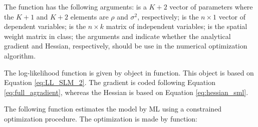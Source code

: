 \begin{knitrout}
\begin{kframe}
\begin{alltt}
    \hlstd{H[K} \hlopt{+}  \hlopt{+} \hlstd{]} \hlkwb{<-} 
    \hlstd{H[K} \hlopt{+}  \hlopt{+} \hlstd{]} \hlkwb{<-} 
    \hlstd{H[K} \hlopt{+} \hlstd{,} \hlopt{:}\hlstd{K]}   \hlkwb{<-} 
    \hlstd{H[K} \hlopt{+}  \hlopt{+} \hlstd{]} \hlkwb{<-} 
    \hlstd{H[K} \hlopt{+}  \hlopt{+} \hlstd{]} \hlkwb{<-} 
     \hlstd{)} \hlkwb{<-} 
  \hlstd{\}}
\hlstd{\}}
\end{alltt}
\end{kframe}
\end{knitrout}

The function  has the following arguments:  is a $K + 2$ vector of parameters where the $K + 1$ and $K + 2$ elements are $\rho$ and $\sigma^2$, respectively;  is the $n\times 1$ vector of dependent variables;  is the $n\times k$ matrix of independent variables;  is the spatial weight matrix in  class; the arguments  and  indicate whether the analytical gradient and Hessian, respectively, should be use in the numerical optimization algorithm.

The log-likelihood function is given by object  in  function. This object is based on Equation \eqref{eq:LL_SLM_2}. The gradient is coded following Equation \eqref{eq:full_agradient}, whereas the Hessian is based on Equation \eqref{eq:hessian_sml}.

The following function estimates the model by ML using a constrained optimization procedure. The optimization is made by  function:

